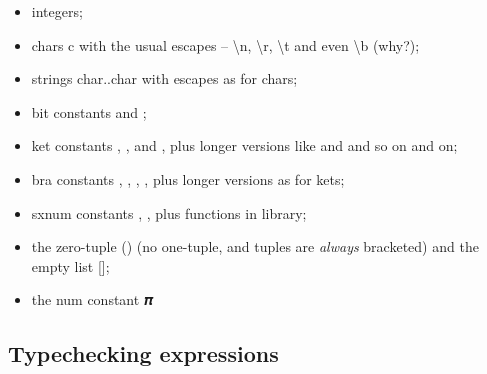 \begin{itemize}
\item integers;
\item chars c with the usual escapes -- \textbackslash{n}, \textbackslash{r}, \textbackslash{t} and even \textbackslash{b} (why?);
\item strings char..char with escapes as for chars;
\item bit constants  and ;
\item ket constants \zero, \one, \plus{} and \minus, plus longer versions like  and \bv{+-+} and so on and on;
\item bra constants , , \vb{+}, \vb{-}, plus longer versions as for kets; 
\item sxnum constants , , plus functions in library;
\item the zero-tuple () (no one-tuple, and tuples are \emph{always} bracketed) and the empty list [];
\item the num constant 𝝅
\end{itemize}

\subsection{Typechecking expressions}

